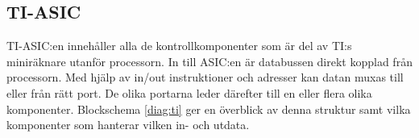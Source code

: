 \documentclass[main.tex]{subfiles}
\begin{document}
\subsection{TI-ASIC}
TI-ASIC:en innehåller alla de kontrollkomponenter som är del av TI:s
miniräknare utanför processorn. In till ASIC:en är databussen direkt kopplad
från processorn. Med hjälp av in/out instruktioner och adresser kan datan muxas
till eller från rätt port. De olika portarna leder därefter till en eller flera
olika komponenter. Blockschema \ref{diag:ti} ger en överblick av denna struktur
samt vilka komponenter som hanterar vilken in- och utdata.






\end{document}
